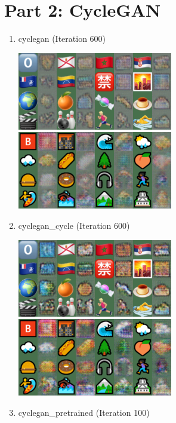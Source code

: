 \documentclass{article}
\begin{document}
\section*{Part 2: CycleGAN}
\begin{enumerate}
\item
cyclegan (Iteration 600)

\includegraphics[scale=0.7]{samples_cyclegan/sample-000600-X-Y.png}
\includegraphics[scale=0.7]{samples_cyclegan/sample-000600-Y-X.png}

\item
cyclegan\_cycle (Iteration 600)

\includegraphics[scale=0.7]{samples_cyclegan_cycle/sample-000600-X-Y.png}
\includegraphics[scale=0.7]{samples_cyclegan_cycle/sample-000600-Y-X.png}

\item
cyclegan\_pretrained (Iteration 100)


\end{enumerate}
\end{document}
